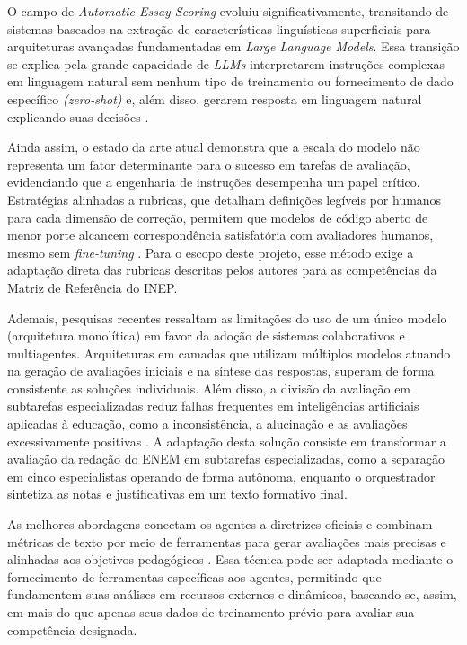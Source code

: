 \documentclass[12pt]{article}
\begin{document}
O campo de \textit{Automatic Essay Scoring} evoluiu significativamente, transitando de sistemas baseados na extração de características linguísticas superficiais para arquiteturas avançadas fundamentadas em \textit{Large Language Models}. Essa transição se explica pela grande capacidade de \textit{LLMs} interpretarem instruções complexas em linguagem natural sem nenhum tipo de treinamento ou fornecimento de dado específico \textit{(zero-shot)} e, além disso, gerarem resposta em linguagem natural explicando suas decisões \cite{aesSoTA}.

Ainda assim, o estado da arte atual demonstra que a escala do modelo não representa um fator determinante para o sucesso em tarefas de avaliação, evidenciando que a engenharia de instruções desempenha um papel crítico. Estratégias alinhadas a rubricas, que detalham definições legíveis por humanos para cada dimensão de correção, permitem que modelos de código aberto de menor porte alcancem correspondência satisfatória com avaliadores humanos, mesmo sem \textit{fine-tuning} \cite{openSourceSLM}. Para o escopo deste projeto, esse método exige a adaptação direta das rubricas descritas pelos autores para as competências da Matriz de Referência do INEP.

Ademais, pesquisas recentes ressaltam as limitações do uso de um único modelo (arquitetura monolítica) em favor da adoção de sistemas colaborativos e multiagentes. Arquiteturas em camadas que utilizam múltiplos modelos atuando na geração de avaliações iniciais e na síntese das respostas, superam de forma consistente as soluções individuais. Além disso, a divisão da avaliação em subtarefas especializadas reduz falhas frequentes em inteligências artificiais aplicadas à educação, como a inconsistência, a alucinação e as avaliações excessivamente positivas \cite{agenticEdu}. A adaptação desta solução consiste em transformar a avaliação da redação do ENEM em subtarefas especializadas, como a separação em cinco especialistas operando de forma autônoma, enquanto o orquestrador sintetiza as notas e justificativas em um texto formativo final.

As melhores abordagens conectam os agentes a diretrizes oficiais e combinam métricas de texto por meio de ferramentas para gerar avaliações mais precisas e alinhadas aos objetivos pedagógicos \cite{tools}. Essa técnica pode ser adaptada mediante o fornecimento de ferramentas específicas aos agentes, permitindo que fundamentem suas análises em recursos externos e dinâmicos, baseando-se, assim, em mais do que apenas seus dados de treinamento prévio para avaliar sua competência designada.
\end{document}
